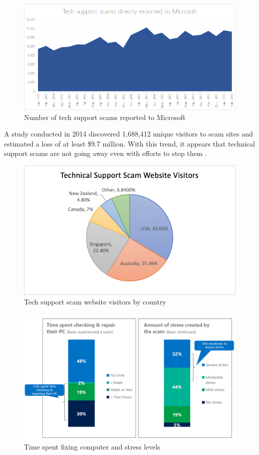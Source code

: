 \documentclass[final]{IEEEtran}
\begin{document}
\begin{figure}[htbp]
\centerline{\includegraphics[keepaspectratio=true, scale = 0.32]{image1.png}}
\caption{Number of tech support scams reported to Microsoft}
\label{fig2}
\end{figure}

A study \cite{b2} conducted in 2014 discovered 1,688,412 unique visitors to scam sites and estimated a loss of at least \$9.7 million. With this trend, it appears that technical support scams are not going away even with efforts to stop them \cite[p. 8]{b2}.

\begin{figure}[htbp]
\centerline{\includegraphics[keepaspectratio=true, scale = 0.30]{image0.png}}
\caption{Tech support scam website visitors by country}
\label{fig1}
\end{figure}

\begin{figure}[htbp]
\centerline{\includegraphics[keepaspectratio=true, scale = 0.28]{timeandstress.png}}
\caption{Time spent fixing computer and stress levels}
\label{fig3}
\end{figure}
\end{document}
